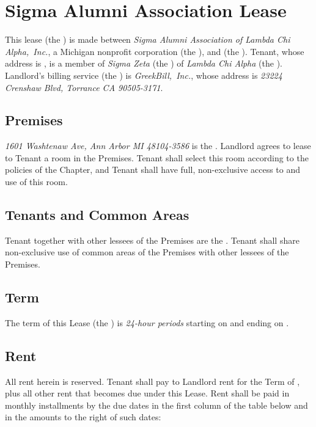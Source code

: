 \documentclass{article}
\begin{document}
\section*{Sigma Alumni Association \leaseDescription{} Lease}

This lease (the ) is made between
\emph{Sigma Alumni Association of Lambda Chi Alpha,~Inc.}, a Michigan nonprofit
corporation (the ), and
\emph{\tenantName} (the ). Tenant, whose address
is \emph{\tenantAddress}, is a member of \emph{Sigma Zeta} (the
) of \emph{Lambda Chi Alpha} (the
). Landlord’s billing service (the
) is \emph{GreekBill,~Inc.}, whose
address is \emph{23224 Crenshaw Blvd, Torrance CA 90505-3171}.

\subsection{Premises}
\emph{1601 Washtenaw Ave, Ann Arbor MI 48104-3586} is the
. Landlord agrees to lease to Tenant a room in
the Premises. Tenant shall select this room according to the policies of the
Chapter, and Tenant shall have full, non-exclusive access to and use of this
room.

\subsection{Tenants and Common Areas}
Tenant together with other lessees of the Premises are the
. Tenant shall share non-exclusive use of common
areas of the Premises with other lessees of the Premises.

\subsection{Term}
The term of this Lease (the ) is
\emph{\the\termDuration{} 24-hour periods} starting on
\emph{} and ending on
\emph{}.

\subsection{Rent}
All rent herein is reserved. Tenant shall pay to Landlord rent for the Term of
\emph{\rentTotal}, plus all other rent that becomes due under this Lease. Rent
shall be paid in monthly installments by the due dates in the first column of
the table below and in the amounts to the right of such dates:
\end{document}
